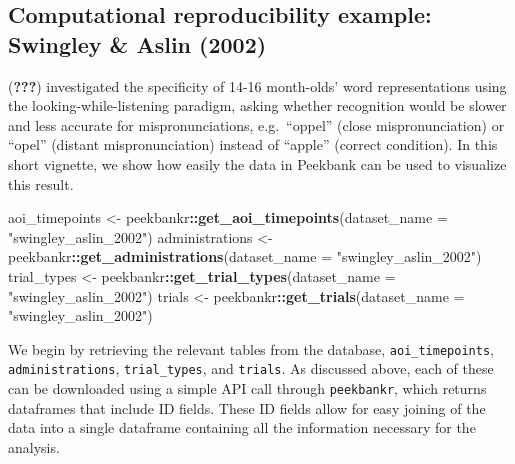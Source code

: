 \documentclass[
  english,
  man,floatsintext]{apa6}
\newenvironment{Shaded}{\begin{snugshade}}{\end{snugshade}}
\newcommand{\DataTypeTok}[1]{\textcolor[rgb]{0.13,0.29,0.53}{#1}}
\newcommand{\KeywordTok}[1]{\textcolor[rgb]{0.13,0.29,0.53}{\textbf{#1}}}
\newcommand{\NormalTok}[1]{#1}
\newcommand{\OperatorTok}[1]{\textcolor[rgb]{0.81,0.36,0.00}{\textbf{#1}}}
\newcommand{\StringTok}[1]{\textcolor[rgb]{0.31,0.60,0.02}{#1}}
\begin{document}
\hypertarget{computational-reproducibility-example-swingley-aslin-2002}{%
\subsection{Computational reproducibility example: Swingley \& Aslin (2002)}\label{computational-reproducibility-example-swingley-aslin-2002}}

({\textbf{???}}) investigated the specificity of 14-16 month-olds' word representations using the looking-while-listening paradigm, asking whether recognition would be slower and less accurate for mispronunciations, e.g.~\enquote{oppel} (close mispronunciation) or \enquote{opel} (distant mispronunciation) instead of \enquote{apple} (correct condition). In this short vignette, we show how easily the data in Peekbank can be used to visualize this result.

\begin{Shaded}
\begin{Highlighting}[]
\NormalTok{aoi_timepoints <-}\StringTok{ }\NormalTok{peekbankr}\OperatorTok{::}\KeywordTok{get_aoi_timepoints}\NormalTok{(}\DataTypeTok{dataset_name =} \StringTok{"swingley_aslin_2002"}\NormalTok{)}
\NormalTok{administrations <-}\StringTok{ }\NormalTok{peekbankr}\OperatorTok{::}\KeywordTok{get_administrations}\NormalTok{(}\DataTypeTok{dataset_name =} \StringTok{"swingley_aslin_2002"}\NormalTok{)}
\NormalTok{trial_types <-}\StringTok{ }\NormalTok{peekbankr}\OperatorTok{::}\KeywordTok{get_trial_types}\NormalTok{(}\DataTypeTok{dataset_name =} \StringTok{"swingley_aslin_2002"}\NormalTok{)}
\NormalTok{trials <-}\StringTok{ }\NormalTok{peekbankr}\OperatorTok{::}\KeywordTok{get_trials}\NormalTok{(}\DataTypeTok{dataset_name =} \StringTok{"swingley_aslin_2002"}\NormalTok{)}
\end{Highlighting}
\end{Shaded}

We begin by retrieving the relevant tables from the database, \texttt{aoi\_timepoints}, \texttt{administrations}, \texttt{trial\_types}, and \texttt{trials}. As discussed above, each of these can be downloaded using a simple API call through \texttt{peekbankr}, which returns dataframes that include ID fields. These ID fields allow for easy joining of the data into a single dataframe containing all the information necessary for the analysis.
\end{document}

